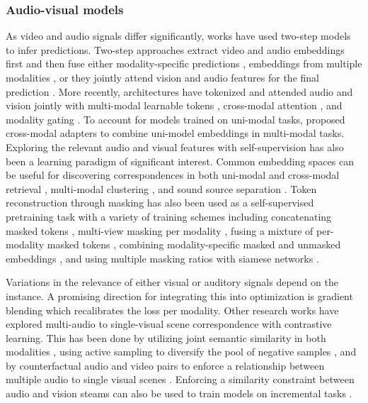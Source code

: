 \subsubsection{Audio-visual models} 


As video and audio signals differ significantly, works have used two-step models to infer predictions. Two-step approaches extract video and audio embeddings first and then fuse either modality-specific predictions \citep{fayek2020large}, embeddings from multiple modalities \citep{xiao2020audiovisual}, or they jointly attend vision and audio features for the final prediction \citep{gong2022uavm}. More recently, architectures have tokenized and attended audio and vision jointly with multi-modal learnable tokens \citep{nagrani2021attention}, cross-modal attention \citep{jaegle2021perceiver}, and modality gating \citep{xue2023dynamic}. To account for models trained on uni-modal tasks, \citet{lin2023vision} proposed cross-modal adapters to combine uni-model embeddings in multi-modal tasks. Exploring the relevant audio and visual features with self-supervision has also been a learning paradigm of significant interest. Common embedding spaces can be useful for discovering correspondences in both uni-modal and cross-modal retrieval \citep{arandjelovic2018objects,wu2021exploring}, multi-modal clustering \citep{hu2019deep}, and sound source separation \citep{hu2022mix,mo2023unified,zhao2018sound}. Token reconstruction through masking has also been used as a self-supervised pretraining task with a variety of training schemes including concatenating masked tokens \citep{gong2023contrastive}, multi-view masking per modality \citep{huang2023mavil}, fusing a mixture of per-modality masked tokens \citep{guo2024crossmae}, combining modality-specific masked and unmasked embeddings \citep{georgescu2023audiovisual}, and using multiple masking ratios with siamese networks \citep{lin2024siamese}. 

Variations in the relevance of either visual or auditory signals depend on the instance. A promising direction for integrating this into optimization is gradient blending \citep{wang2020makes} which recalibrates the loss per modality. Other research works have explored multi-audio to single-visual scene correspondence with contrastive learning. This has been done by utilizing joint semantic similarity in both modalities \citep{morgado2021audio}, using active sampling to diversify the pool of negative samples
\citep{ma2021active}, and by counterfactual audio and video pairs to enforce a relationship between multiple audio to single visual scenes \citep{singh2024looking}. Enforcing a similarity constraint between audio and vision steams can also be used to train models on incremental tasks \citep{pian2023audio}.




